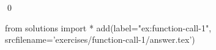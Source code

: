 \begin{ex}
  \label{ex:function-call-1}
  
  \qed
\end{ex}
\begin{python0}
from solutions import *
add(label="ex:function-call-1",
    srcfilename='exercises/function-call-1/answer.tex') 
\end{python0}                              
